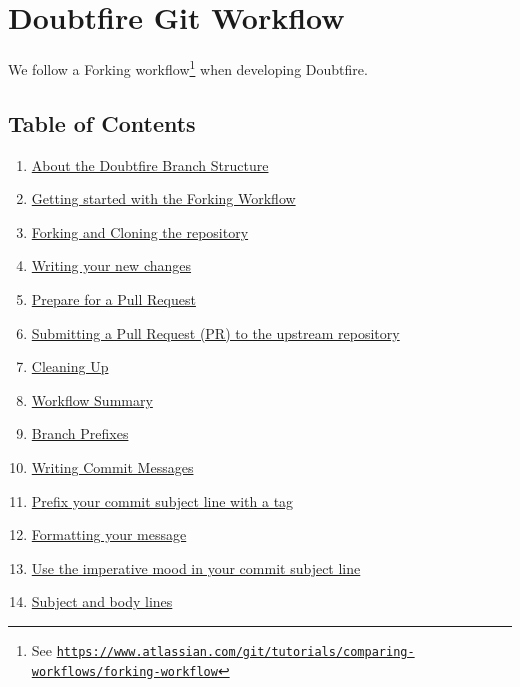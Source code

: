 \documentclass[12pt,a4paper,]{article}
\date{}
\renewcommand{\href}[2]{#2\footnote{See \texttt{\url{#1}}}}
\providecommand{\tightlist}{%
  \setlength{\itemsep}{0pt}\setlength{\parskip}{0pt}}
\begin{document}
{
\setcounter{tocdepth}{3}
\tableofcontents
}
\newpage
\section{Doubtfire Git Workflow}\label{doubtfire-git-workflow}

We follow a
\href{https://www.atlassian.com/git/tutorials/comparing-workflows/forking-workflow}{Forking
workflow} when developing Doubtfire.

\subsection{Table of Contents}\label{table-of-contents}

\begin{enumerate}
\def\labelenumi{\arabic{enumi}.}
\tightlist
\item
  \protect\hyperlink{about-the-doubtfire-branch-structure}{About the
  Doubtfire Branch Structure}
\item
  \protect\hyperlink{getting-started-with-the-forking-workflow}{Getting
  started with the Forking Workflow}
\item
  \protect\hyperlink{1-forking-and-cloning-the-repository}{Forking and
  Cloning the repository}
\item
  \protect\hyperlink{2-writing-your-new-changes}{Writing your new
  changes}
\item
  \protect\hyperlink{3-prepare-for-a-pull-request}{Prepare for a Pull
  Request}
\item
  \protect\hyperlink{4-submitting-a-pull-request-pr-to-the-upstream-repository}{Submitting
  a Pull Request (PR) to the upstream repository}
\item
  \protect\hyperlink{5-cleaning-up}{Cleaning Up}
\item
  \protect\hyperlink{workflow-summary}{Workflow Summary}
\item
  \protect\hyperlink{branch-prefixes}{Branch Prefixes}
\item
  \protect\hyperlink{writing-commit-messages}{Writing Commit Messages}
\item
  \protect\hyperlink{prefix-your-commit-subject-line-with-a-tag}{Prefix
  your commit subject line with a tag}
\item
  \protect\hyperlink{formatting-your-message}{Formatting your message}
\item
  \protect\hyperlink{use-the-imperative-mood-in-your-commit-subject-line}{Use
  the imperative mood in your commit subject line}
\item
  \protect\hyperlink{subject-and-body-lines}{Subject and body lines}
\end{enumerate}
\end{document}
